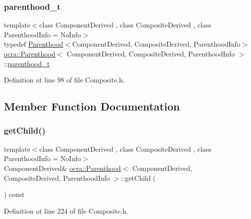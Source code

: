 \subsubsection{\texorpdfstring{parenthood\+\_\+t}{parenthood\_t}}
{\footnotesize\ttfamily template$<$class Component\+Derived , class Composite\+Derived , class Parenthood\+Info  = No\+Info$>$ \\
typedef \hyperlink{classocra_1_1Parenthood}{Parenthood}$<$Component\+Derived, Composite\+Derived, Parenthood\+Info$>$ \hyperlink{classocra_1_1Parenthood}{ocra\+::\+Parenthood}$<$ Component\+Derived, Composite\+Derived, Parenthood\+Info $>$\+::\hyperlink{classocra_1_1Parenthood_acdae20cb747190b5dc9dbe42290bde78}{parenthood\+\_\+t}}



Definition at line 98 of file Composite.\+h.



\subsection{Member Function Documentation}
\hypertarget{classocra_1_1Parenthood_a7056661e3f0e6500141d305e6397f7c0}{}\label{classocra_1_1Parenthood_a7056661e3f0e6500141d305e6397f7c0} 
\subsubsection{\texorpdfstring{get\+Child()}{getChild()}}
{\footnotesize\ttfamily template$<$class Component\+Derived , class Composite\+Derived , class Parenthood\+Info  = No\+Info$>$ \\
Component\+Derived\& \hyperlink{classocra_1_1Parenthood}{ocra\+::\+Parenthood}$<$ Component\+Derived, Composite\+Derived, Parenthood\+Info $>$\+::get\+Child (\begin{DoxyParamCaption}{ }\end{DoxyParamCaption}) const\hspace{0.3cm}{\ttfamily [inline]}}



Definition at line 224 of file Composite.\+h.

\hypertarget{classocra_1_1Parenthood_a3f3dc26c36363b7b968a7d0a26bc71a5}{}\label{classocra_1_1Parenthood_a3f3dc26c36363b7b968a7d0a26bc71a5} 

